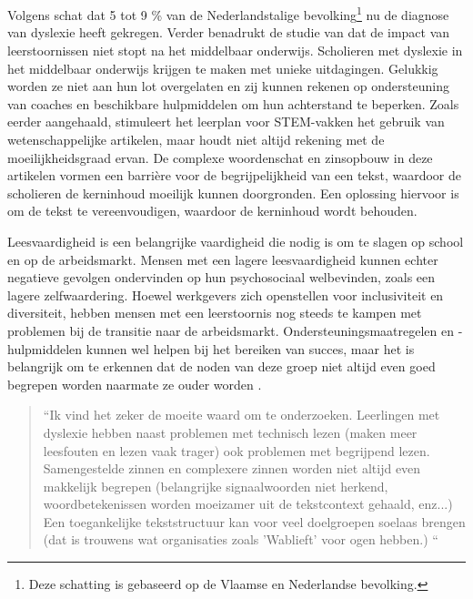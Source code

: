 \section{}%
\label{sec:probleemstelling}

Volgens \textcite{Ghesquiere2018} schat dat 5 tot 9 \% van de Nederlandstalige bevolking\footnote{Deze schatting is gebaseerd op de Vlaamse en Nederlandse bevolking.} nu de diagnose van dyslexie heeft gekregen. Verder benadrukt de studie van \textcite{Lissens2020} dat de impact van leerstoornissen niet stopt na het middelbaar onderwijs. Scholieren met dyslexie in het middelbaar onderwijs krijgen te maken met unieke uitdagingen. Gelukkig worden ze niet aan hun lot overgelaten en zij kunnen rekenen op ondersteuning van coaches en beschikbare hulpmiddelen om hun achterstand te beperken. Zoals eerder aangehaald, stimuleert het leerplan voor STEM-vakken het gebruik van wetenschappelijke artikelen, maar houdt niet altijd rekening met de moeilijkheidsgraad ervan. De complexe woordenschat en zinsopbouw in deze artikelen vormen een barrière voor de begrijpelijkheid van een tekst, waardoor de scholieren de kerninhoud moeilijk kunnen doorgronden. Een oplossing hiervoor is om de tekst te vereenvoudigen, waardoor de kerninhoud wordt behouden.

Leesvaardigheid is een belangrijke vaardigheid die nodig is om te slagen op school en op de arbeidsmarkt. Mensen met een lagere leesvaardigheid kunnen echter negatieve gevolgen ondervinden op hun psychosociaal welbevinden, zoals een lagere zelfwaardering. Hoewel werkgevers zich openstellen voor inclusiviteit en diversiteit, hebben mensen met een leerstoornis nog steeds te kampen met problemen bij de transitie naar de arbeidsmarkt. Ondersteuningsmaatregelen en -hulpmiddelen kunnen wel helpen bij het bereiken van succes, maar het is belangrijk om te erkennen dat de noden van deze groep niet altijd even goed begrepen worden naarmate ze ouder worden \autocite{Lissens2020}.

\begin{quote}
	“Ik vind het zeker de moeite waard om te onderzoeken. Leerlingen met dyslexie hebben naast problemen met technisch lezen (maken meer leesfouten en lezen vaak trager) ook problemen met begrijpend lezen. Samengestelde zinnen en complexere zinnen worden niet altijd even makkelijk begrepen (belangrijke signaalwoorden niet herkend, woordbetekenissen worden moeizamer uit de tekstcontext gehaald, enz...) Een toegankelijke tekststructuur kan voor veel doelgroepen soelaas brengen (dat is trouwens wat organisaties zoals 'Wablieft' voor ogen hebben.) “
\end{quote}

